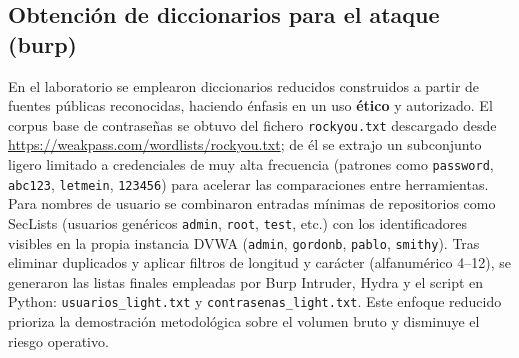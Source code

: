 \documentclass[letterpaper,12pt]{article}
\let\origsubsection\subsection
\renewcommand{\subsection}{\FloatBarrier\origsubsection}
\begin{document}
\subsection{Obtención de diccionarios para el ataque (burp)}
En el laboratorio se emplearon diccionarios reducidos construidos a partir de fuentes públicas reconocidas, haciendo énfasis en un uso \textbf{ético} y autorizado. El corpus base de contraseñas se obtuvo del fichero \texttt{rockyou.txt} descargado desde \url{https://weakpass.com/wordlists/rockyou.txt}; de él se extrajo un subconjunto ligero limitado a credenciales de muy alta frecuencia (patrones como \texttt{password}, \texttt{abc123}, \texttt{letmein}, \texttt{123456}) para acelerar las comparaciones entre herramientas. Para nombres de usuario se combinaron entradas mínimas de repositorios como SecLists (usuarios genéricos \texttt{admin}, \texttt{root}, \texttt{test}, etc.) con los identificadores visibles en la propia instancia DVWA (\texttt{admin}, \texttt{gordonb}, \texttt{pablo}, \texttt{smithy}). Tras eliminar duplicados y aplicar filtros de longitud y carácter (alfanumérico 4--12), se generaron las listas finales empleadas por Burp Intruder, Hydra y el script en Python: \texttt{usuarios\_light.txt} y \texttt{contrasenas\_light.txt}. Este enfoque reducido prioriza la demostración metodológica sobre el volumen bruto y disminuye el riesgo operativo.
\end{document}
